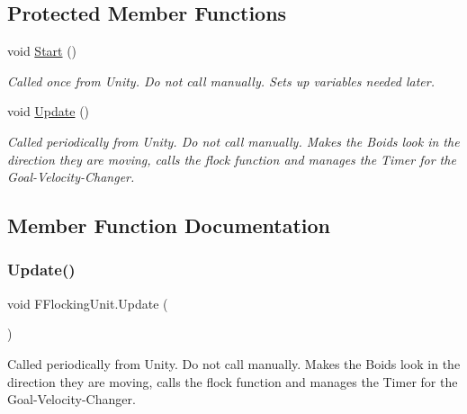 \subsection*{Protected Member Functions}
\begin{DoxyCompactItemize}
\item 
\mbox{\label{class_f_flocking_unit_a2d94e65705a7536fc3c16b2013f9cc16}} 
void \hyperlink{class_f_flocking_unit_a2d94e65705a7536fc3c16b2013f9cc16}{Start} ()
\begin{DoxyCompactList}\small\item\em Called once from Unity. Do not call manually. Sets up variables needed later. \end{DoxyCompactList}\item 
void \hyperlink{class_f_flocking_unit_a86c5e9761219f7e36329f497406ef47b}{Update} ()
\begin{DoxyCompactList}\small\item\em Called periodically from Unity. Do not call manually. Makes the Boids look in the direction they are moving, calls the flock function and manages the Timer for the Goal-\/\+Velocity-\/\+Changer. \end{DoxyCompactList}\end{DoxyCompactItemize}


\subsection{Member Function Documentation}
\mbox{\label{class_f_flocking_unit_a86c5e9761219f7e36329f497406ef47b}} 
\subsubsection{\texorpdfstring{Update()}{Update()}}
{\footnotesize\ttfamily void F\+Flocking\+Unit.\+Update (\begin{DoxyParamCaption}{ }\end{DoxyParamCaption})\hspace{0.3cm}{\ttfamily [protected]}}



Called periodically from Unity. Do not call manually. Makes the Boids look in the direction they are moving, calls the flock function and manages the Timer for the Goal-\/\+Velocity-\/\+Changer. 

